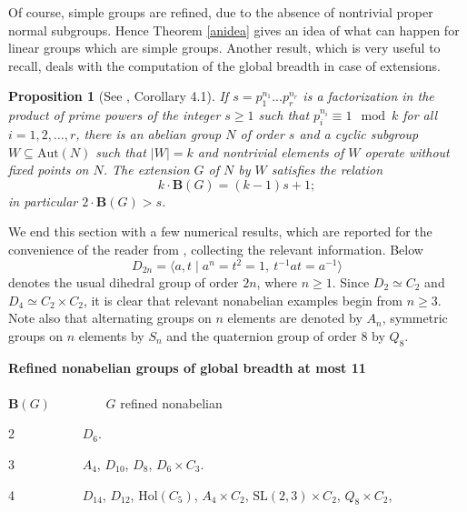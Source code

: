 \documentclass{amsart}
\newtheorem{proposition}[theorem]{Proposition}
\theoremstyle{definition}
\numberwithin{equation}{section}
\begin{document}
Of course, simple groups are refined, due to the absence of nontrivial proper normal subgroups. Hence Theorem \ref{anidea} gives an idea of what can happen for linear groups which are simple groups. Another result, which is very useful to recall, deals with the computation of the global breadth in case of extensions. 


\begin{proposition}[See \cite{hr2}, Corollary 4.1]\label{tek1}
If $s = p_1^{n_1}...p_r^{n_r}$ is a factorization in the  product of prime powers of the integer $s \ge 1$ such that $p_i^{n_i} \equiv 1 \mod k$ for all $i=1,2,\ldots, r$,  there is an abelian group $N$ of order $s$ and a 
cyclic subgroup $W \subseteq \mathrm{Aut}(N)$ such that $|W| = k$ and nontrivial elements of $W$ operate without fixed points on $N$. The extension $G$ of $N$ by $W$ satisfies the relation \begin{equation}k \cdot \mathbf{ B}(G) = (k-1)s + 1;
\end{equation} in particular
 $2 \cdot \mathbf{ B}(G) > s$.\end{proposition}


We end this section with a few numerical results, which are reported for the convenience of the reader from \cite{hr1, hr2, hr3, ms, meng2016, meng2017}, collecting the relevant information. Below \begin{equation}D_{2n}=\langle a,t \mid a^n=t^2=1, \ t^{-1}at=a^{-1}\rangle
\end{equation} denotes the usual dihedral group of order $2n$, where $n \ge 1$. Since  $D_2 \simeq C_2$ and $D_4 \simeq C_2 \times C_2$, it is clear that relevant nonabelian examples begin from $n \ge 3$. Note also that alternating groups on $n$ elements are denoted by $A_n$,  symmetric groups on $n$ elements by $S_n$ and the quaternion group of order 8 by $Q_8$.

\medskip
\medskip

\textbf{Refined nonabelian groups of global breadth at most 11}\\
\\
$\mathbf{B}(G)$ \ \ \ \  \ \ \ \  $G$ refined nonabelian 

\medskip
\medskip

2 \ \ \ \ \ \ \ \  \ \ $D_6$. 

\medskip
\medskip

3 \ \ \ \ \ \ \ \  \ \ $A_4$, $D_{10}$, $D_8$, $D_6 \times C_3$.

\medskip
\medskip

4 \ \ \ \ \ \ \ \  \ \ $D_{14}$, $D_{12}$, $\mathrm{Hol}(C_5)$, $A_4 \times C_2$, $ \mathrm{SL}(2,3) \times C_2$, $Q_8 \times C_2$, 
\end{document}
